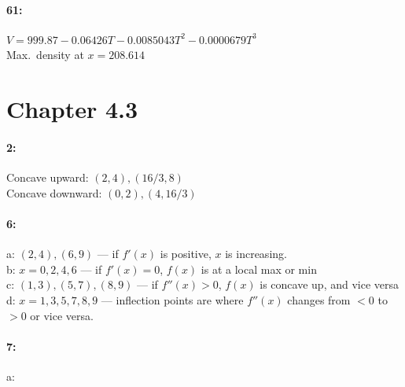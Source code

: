 \documentclass{article}
\begin{document}
    \paragraph*{61:\\}
        $V = 999.87 - 0.06426T - 0.0085043T^2 - 0.0000679T^3$\\
        Max.\ density at $x = 208.614$
    
    \section*{Chapter 4.3}
    \paragraph*{2:\\}
        Concave upward:   $(2, 4), (16/3, 8)$\\
        Concave downward: $(0, 2), (4, 16/3)$\\

    \paragraph{6:\\}
        a: $(2, 4), (6, 9)$ — if $f'(x)$ is positive, $x$ is increasing. \\
        b: $x = {0, 2, 4, 6}$ — if $f'(x) = 0$, $f(x)$ is at a local max or min\\
        c: $(1, 3), (5, 7), (8, 9)$ — if $f''(x) > 0$, $f(x)$ is concave up, and vice versa\\
        d: $x = {1, 3, 5, 7, 8, 9}$ — inflection points are where $f''(x)$ changes from $<0$ to $>0$ or vice versa.\\
    
    \paragraph{7:\\}
        a: 
\end{document}
